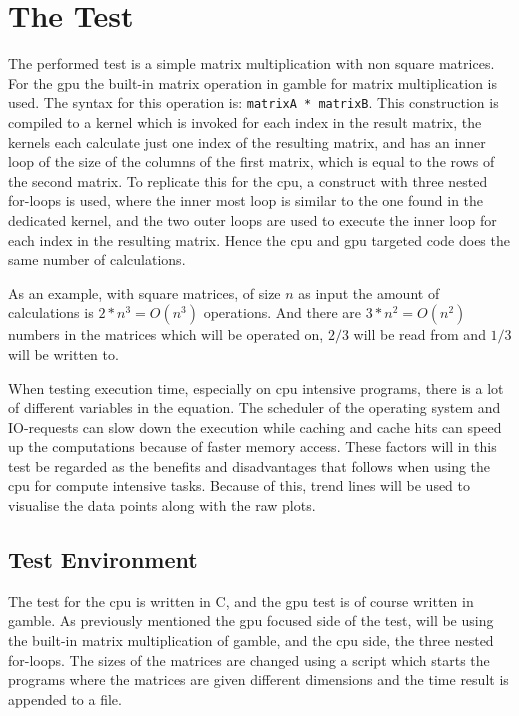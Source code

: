 \section{The Test} %
\label{sec:the_test}
The performed test is a simple matrix multiplication with non square matrices.
For the \acrshort{gpu} the built-in matrix operation in \gls{gamble} for matrix multiplication is used. 
The syntax for this operation is: \texttt{matrixA * matrixB}. 
This construction is compiled to a kernel which is invoked for each index in the result matrix, the kernels each calculate just one index of the resulting matrix, and has an inner loop of the size of the columns of the first matrix, which is equal to the rows of the second matrix.
To replicate this for the \acrshort{cpu}, a construct with three nested for-loops is used, where the inner most loop is similar to the one found in the dedicated kernel, and the two outer loops are used to execute the inner loop for each index in the resulting matrix.
Hence the \acrshort{cpu} and \acrshort{gpu} targeted code does the same number of calculations.
 
As an example, with square matrices, of size $n$ as input the amount of calculations is $2*n^3 = O(n^3)$ operations. 
And there are $3*n^2 = O(n^2)$ numbers in the matrices which will be operated on, $2/3$ will be read from and $1/3$ will be written to.

When testing execution time, especially on \acrshort{cpu} intensive programs, there is a lot of different variables in the equation. 
The scheduler of the operating system and IO-requests can slow down the execution while caching and cache hits can speed up the computations because of faster memory access. 
These factors will in this test be regarded as the benefits and disadvantages that follows when using the \acrshort{cpu} for compute intensive tasks.
Because of this, trend lines will be used to visualise the data points along with the raw plots. 

\subsection{Test Environment} %
\label{sub:test_environment}
The test for the \acrshort{cpu} is written in C, and the \acrshort{gpu} test is of course written in \gls{gamble}.
As previously mentioned the \acrshort{gpu} focused side of the test, will be using the built-in matrix multiplication of \gls{gamble}, and the \acrshort{cpu} side, the three nested for-loops.
The sizes of the matrices are changed using a script which starts the programs where the matrices are given different dimensions and the time result is appended to a file.

